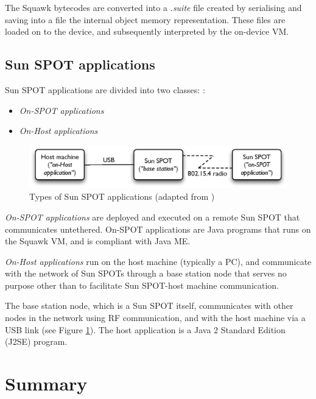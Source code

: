 The Squawk bytecodes are converted into a \emph{.suite} file created by
serialising and saving into a file the internal object memory representation.
These files are loaded on to the device, and subsequently interpreted by the
on-device VM.

\subsection{Sun SPOT applications} \label{subsec:sunspotapps}

Sun SPOT applications are divided into two classes:
\cite{sun_developer:2008}:

\begin{itemize}
  \item \emph{On-SPOT applications}
  \item \emph{On-Host applications}
\end{itemize}

\begin{figure}[h]
\centering
\includegraphics[width=\textwidth]{img/SunSPOTS_applications.eps} 
\caption[Types of Sun SPOT applications]{Types of Sun SPOT applications (adapted from
\cite{sun_developer:2008})}
\label{Fig:SunSPOTS_applications}
\end{figure}  

\emph{On-SPOT applications}  are deployed and
executed on a remote Sun SPOT that communicates untethered. On-SPOT
applications are Java programs that runs on the Squawk VM, and is compliant
with Java ME. 

\emph{On-Host applications} run on the host machine
(typically a PC), and communicate with the network of Sun SPOTs through a base
station node that serves no purpose other than to facilitate Sun SPOT-host
machine communication. 
  
The base station node, which is a Sun SPOT itself, communicates with other
nodes in the network using RF communication, and with the host machine via a
USB link (see Figure \ref{Fig:SunSPOTS_applications}). The host application is
a Java 2 Standard Edition (J2SE) program.
  
 
\section{Summary}

